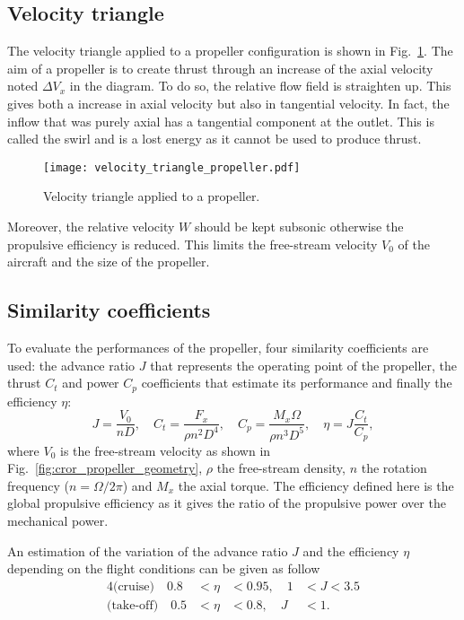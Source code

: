 \subsection{Velocity triangle}
\label{sub:cror_propeller_velocity_triangle}
The velocity triangle applied to a propeller configuration
is shown in Fig.~\ref{fig:cror_velocity_triangle_propeller}.
The aim of a propeller is to create thrust through an increase
of the axial velocity noted $\Delta V_x$ in the diagram. To do
so, the relative flow field is straighten up. This gives both
a increase in axial velocity but also in tangential velocity.
In fact, the inflow that was purely axial has a tangential
component at the outlet. This is called the swirl and
is a lost energy as it cannot be used to produce thrust.
\begin{figure}[htbp]
  \centering
  \texttt{[image: velocity\_triangle\_propeller.pdf]}
  \caption{Velocity triangle applied to a propeller.}
  \label{fig:cror_velocity_triangle_propeller}
\end{figure}
Moreover, the relative velocity $W$ should be kept subsonic
otherwise the propulsive efficiency is reduced. This limits
the free-stream velocity $V_0$ of the aircraft and the size of 
the propeller.

\subsection{Similarity coefficients}
\label{sub:similarity_coefficients}
To evaluate the performances of the propeller, four similarity
coefficients are used:
the advance ratio $J$ that represents the operating point of the propeller,
the thrust $C_t$ and power $C_p$ coefficients that estimate its performance and finally
the efficiency $\eta$:
\begin{equation}
    J = \frac{V_0}{n D}, \quad
    C_t = \frac{F_x}{\rho n ^ 2  D ^ 4}, \quad
    C_p = \frac{M_x \Omega}{\rho n ^ 3 D ^ 5}, \quad
    \eta = J \frac{C_t}{C_p},
\end{equation}
where $V_0$ is the free-stream velocity 
as shown in Fig.~\ref{fig:cror_propeller_geometry},
$\rho$ the free-stream density,
$n$ the rotation frequency ($n = \Omega / 2 \pi$) and
$M_x$ the axial torque.
The efficiency defined here is the global propulsive efficiency
as it gives the ratio of the propulsive power over the mechanical power.

An estimation of the variation of the advance ratio $J$ and the 
efficiency $\eta$ depending on the flight conditions can be given as follow
\begin{alignat}{4}
    \text{(cruise)} \quad  0.8 &< \eta &< 0.95, \quad 1 &< J < 3.5 \\
    \text{(take-off)} \quad  0.5 &< \eta &< 0.8, \quad J &< 1.
\end{alignat}

